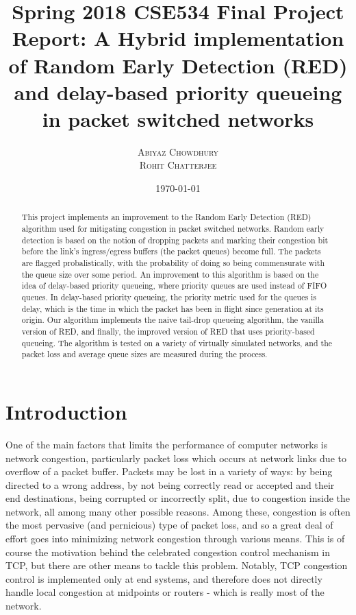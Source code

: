 \documentclass[12pt]{article}
\title{\textbf{Spring 2018 CSE534 Final Project Report: A Hybrid implementation of Random Early Detection (RED) and delay-based priority queueing in packet switched networks}}
\author{\textsc{Abiyaz Chowdhury} \\ \textsc{Rohit Chatterjee}}
\date{\today}
\begin{document}
\maketitle
\begin{abstract}
This project implements an improvement to the Random Early Detection (RED) algorithm used for mitigating congestion in packet switched networks. Random early detection is based on the notion of dropping packets and marking their congestion bit before the link's ingress/egress buffers (the packet queues) become full. The packets are flagged probalistically, with the probability of doing so being commensurate with the queue size over some period. An improvement to this algorithm is based on the idea of delay-based priority queueing, where priority queues are used instead of FIFO queues. In delay-based priority queueing, the priority metric used for the queues is delay, which is the time in which the packet has been in flight since generation at its origin. Our algorithm implements the naive tail-drop queueing algorithm, the vanilla version of RED, and finally, the improved version of RED that uses priority-based queueing. The algorithm is tested on a variety of virtually simulated networks, and the packet loss and average queue sizes are measured during the process.

\end{abstract}

\section{Introduction}
	One of the main factors that limits the performance of computer networks is network congestion, particularly packet loss which occurs at network links due to overflow of a packet buffer. Packets may be lost in a variety of ways: by being directed to a wrong address, by not being correctly read or accepted and their end destinations, being corrupted or incorrectly split, due to congestion inside the network, all among many other possible reasons. Among these, congestion is often the most pervasive (and pernicious) type of packet loss, and so a great deal of effort goes into minimizing network congestion through various means. This is of course the motivation behind the celebrated congestion control mechanism in TCP, but there are other means to tackle this problem. Notably, TCP congestion control is implemented only at end systems, and therefore does not directly handle local congestion at midpoints or routers - which is really most of the network.
\end{document}
